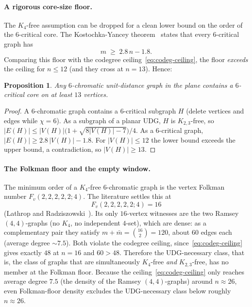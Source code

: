 \documentclass[11pt]{article}
\newtheorem{proposition}{Proposition}
\theoremstyle{definition}
\newcommand{\chrom}{\chi}
\begin{document}
\paragraph{A rigorous core-size floor.} The $K_4$-free assumption can be dropped
for a clean lower bound on the order of the $6$-critical core. The
Kostochka-Yancey theorem~\cite{KostochkaYancey2014} states that every
$6$-critical graph has
\[
  m \;\ge\; 2.8\,n - 1.8.
\]
Comparing this floor with the codegree ceiling~\eqref{eq:codeg-ceiling}, the
floor \emph{exceeds} the ceiling for $n \le 12$ (and they cross at $n = 13$).
Hence:

\begin{proposition}
\label{prop:core13}
Any $6$-chromatic unit-distance graph in the plane contains a $6$-critical core
on at least $13$ vertices.
\end{proposition}

\begin{proof}
A $6$-chromatic graph contains a $6$-critical subgraph $H$ (delete vertices and
edges while $\chrom = 6$). As a subgraph of a planar UDG, $H$ is $K_{2,3}$-free,
so $|E(H)| \le |V(H)|\bigl(1 + \sqrt{8|V(H)| - 7}\bigr)/4$. As a $6$-critical
graph, $|E(H)| \ge 2.8\,|V(H)| - 1.8$. For $|V(H)| \le 12$ the lower bound
exceeds the upper bound, a contradiction, so $|V(H)| \ge 13$.
\end{proof}

\paragraph{The Folkman floor and the empty window.} The minimum order of a
$K_4$-free $6$-chromatic graph is the vertex Folkman number
$F_v(2,2,2,2,2;4)$. The literature settles this at
\[
  F_v(2,2,2,2,2;4) = 16
\]
(Lathrop and Radziszowski~\cite{LathropRadziszowski2011}). Its only $16$-vertex
witnesses are the two Ramsey $(4,4)$-graphs (no $K_4$, no independent $4$-set),
which are dense: as a complementary pair they satisfy
$m + \bar m = \binom{16}{2} = 120$, about $60$ edges each (average degree
$\sim\!7.5$). Both violate the codegree ceiling, since~\eqref{eq:codeg-ceiling}
gives exactly $48$ at $n = 16$ and $60 > 48$. Therefore the UDG-necessary class, that is, the
class of graphs that are simultaneously $K_4$-free \emph{and} $K_{2,3}$-free, has
no member at the Folkman floor. Because the ceiling~\eqref{eq:codeg-ceiling} only
reaches average degree $7.5$ (the density of the Ramsey $(4,4)$-graphs) around
$n \approx 26$, even Folkman-floor density excludes the UDG-necessary class below
roughly $n \approx 26$.
\end{document}
